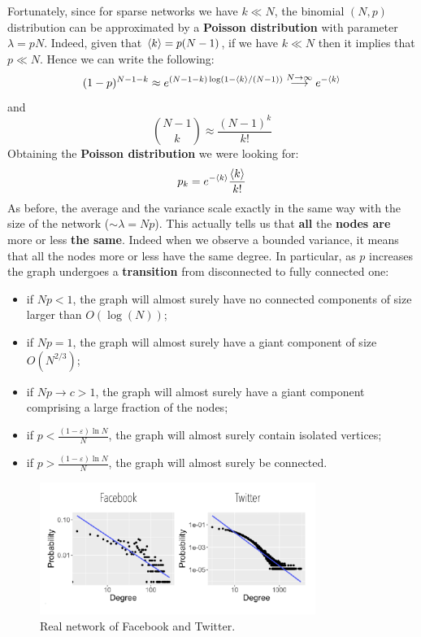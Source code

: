 \documentclass[../main/main.tex]{subfiles}
\begin{document}
Fortunately, since for sparse networks we have \( k \ll N \), the binomial \( (N,p) \) distribution can be approximated by a \textbf{Poisson distribution} with parameter \( \lambda = p N \). Indeed, given that  \( \expval{k} = p(N-1)  \), if we have \( k \ll N \) then it implies that \( p \ll N \). Hence we can write the following:
\begin{equation*}
  (1-p)^{N-1-k} \approx e^{(N-1-k) \log (1- \expval{k}/(N-1) )} \overset{N \rightarrow \infty }{\longrightarrow } e^{- \expval{k} }
\end{equation*}
and
\begin{equation*}
  \binom{N-1}{k} \approx \frac{(N-1)^k}{k!}
\end{equation*}
Obtaining the \textbf{Poisson distribution} we were looking for:
\begin{equation}
  p_k = e^{- \expval{k} } \frac{\expval{k} }{k!}
\end{equation}
As before, the average and the variance scale exactly in the same way with the size of the network ($\sim \lambda = Np$). This actually tells us that \textbf{all} the \textbf{nodes are} more or less \textbf{the same}. Indeed when we observe a bounded variance, it means that all the nodes more or less have the same degree.
In particular, as $p$ increases the graph undergoes a \textbf{transition} from disconnected to fully connected one:
\begin{itemize}
\item if \( N p < 1 \), the graph will almost surely have no connected components of size larger than \( O(\log(N)) \);
\item if \( N p = 1 \), the graph will almost surely have a giant component of size \( O(N^{2/3}) \);
\item if \( N p \rightarrow c > 1 \), the graph will almost surely have a giant component comprising a large fraction of the nodes;
\item if \( p < \frac{(1- \varepsilon )\ln N}{N} \), the graph will almost surely contain isolated vertices;
\item if \( p > \frac{(1- \varepsilon )\ln N}{N} \),  the graph will almost surely be connected.
\end{itemize}

\begin{figure}[h!]
\centering
\includegraphics[width=0.8\textwidth]{../lessons/image/06/4.png}
\caption{\label{fig:06_3} Real network of Facebook and Twitter.}
\end{figure}
\end{document}
